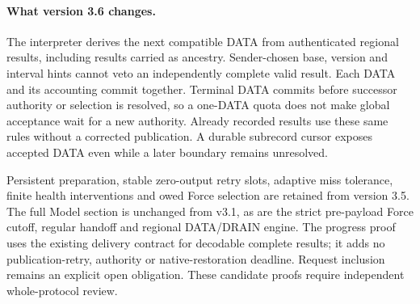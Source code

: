 \documentclass[11pt,a4paper]{article}
\newcounter{protocol}
\begin{document}
\paragraph{What version 3.6 changes.}
The interpreter derives the next compatible DATA from authenticated
regional results, including results carried as ancestry. Sender-chosen
base, version and interval hints cannot veto an independently complete
valid result. Each DATA and its accounting commit together. Terminal
DATA commits before successor authority or selection is resolved, so a
one-DATA quota does not make global acceptance wait for a new authority.
Already recorded results use these same rules without a corrected
publication. A durable subrecord cursor exposes accepted DATA even
while a later boundary remains unresolved.

Persistent preparation, stable zero-output retry slots, adaptive miss
tolerance, finite health interventions and owed Force selection are
retained from version 3.5. The full Model section is unchanged from
v3.1, as are the strict pre-payload Force cutoff, regular handoff and
regional DATA/DRAIN engine. The progress proof uses the existing delivery
contract for decodable complete results; it adds no publication-retry,
authority or native-restoration deadline. Request inclusion remains an
explicit open obligation. These candidate proofs require independent
whole-protocol review.
\end{document}
